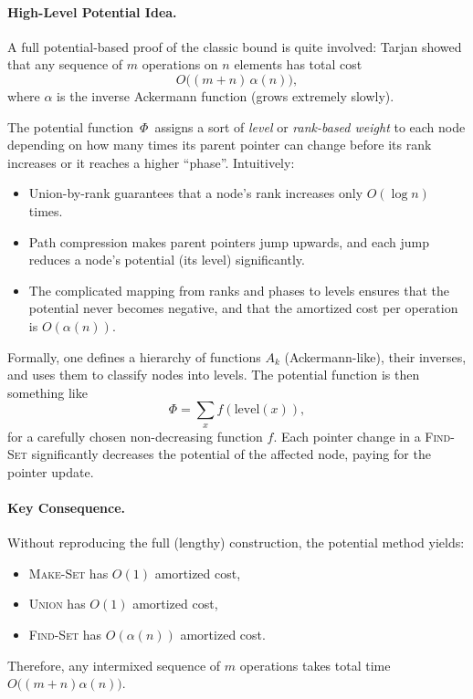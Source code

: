 \documentclass[9pt]{extarticle}
\begin{document}
\paragraph{High-Level Potential Idea.}
A full potential-based proof of the classic bound is quite involved:
Tarjan showed that any sequence of $m$ operations on $n$ elements
has total cost
\[
  O\bigl( (m+n) \, \alpha(n) \bigr),
\]
where $\alpha$ is the inverse Ackermann function (grows extremely slowly).

The potential function $\,\Phi\,$ assigns a sort of \emph{level} or \emph{rank-based weight}
to each node depending on how many times its parent pointer can change
before its rank increases or it reaches a higher ``phase''.
Intuitively:
\begin{itemize}
  \item Union-by-rank guarantees that a node's rank increases only $O(\log n)$ times.
  \item Path compression makes parent pointers jump upwards,
        and each jump reduces a node's potential (its level) significantly.
  \item The complicated mapping from ranks and phases to levels
        ensures that the potential never becomes negative,
        and that the amortized cost per operation is $O(\alpha(n))$.
\end{itemize}

Formally, one defines a hierarchy of functions
$A_k$ (Ackermann-like), their inverses, and uses them to classify nodes into levels.
The potential function is then something like
\[
  \Phi = \sum_{x} f(\text{level}(x)),
\]
for a carefully chosen non-decreasing function $f$.
Each pointer change in a \textsc{Find-Set} significantly decreases the potential
of the affected node, paying for the pointer update.

\paragraph{Key Consequence.}
Without reproducing the full (lengthy) construction, the potential method yields:
\begin{itemize}
  \item \textsc{Make-Set} has $O(1)$ amortized cost,
  \item \textsc{Union} has $O(1)$ amortized cost,
  \item \textsc{Find-Set} has $O(\alpha(n))$ amortized cost.
\end{itemize}
Therefore, any intermixed sequence of $m$ operations
takes total time $O\bigl( (m+n) \alpha(n) \bigr)$.
\end{document}
